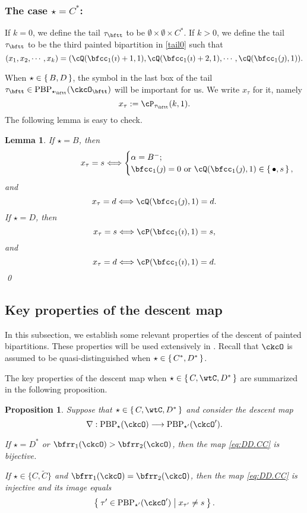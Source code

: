 \documentclass[12pt,a4paper]{amsart}
\numberwithin{equation}{section}
\newtheorem{lem}[thm]{Lemma}
\newtheorem{prop}[thm]{Proposition}
\theoremstyle{remark}
\def\ckcOp{\ckcO^{\prime}}
\def\PBP{\mathrm{PBP}}
\begin{document}
\subsubsection{The case $\star = C^*$:}
If $k=0$, we define the tail $\tau_{\bftt}$ to be
$\emptyset\times \emptyset \times C^{*}$.
If $k> 0$, we define the tail $\tau_\bftt$ to be the third painted bipartition in \eqref{tail0} such that
\[
  (x_1, x_2, \cdots, x_k)= (\cQ(\bfcc_{1}(\imath)+1,1),\cQ(\bfcc_{1}(\imath)+2,1),\cdots, \cQ(\bfcc_{1}(\jmath),1)).
\]


 When $\star \in \set{B,D}$, the symbol in the last box of the tail $\tau_\bftt\in \PBP_{\star_\bftt}(\ckcO_\bftt)$ will be important for us. We write $x_\tau$ for it, namely
\[
x_\tau := \cP_{\tau_\bftt}(k,1).
\]
 The following lemma is easy to check.

\begin{lem}\label{tailtip}
If $\star=B$, then
\[
\hspace{9em} x_\tau=s\Longleftrightarrow
\begin{cases}
  \alpha=B^-;\\
  \bfcc_1(\jmath)=0 \text{ or }\cQ(\bfcc_{1}(\jmath),1) \in\set{\bullet, s},
  \end{cases}
\]
and
\[
x_\tau=d \Longleftrightarrow
\cQ(\bfcc_{1}(\jmath),1) =d.
\]
If $\star=D$, then
\[
x_\tau=s\Longleftrightarrow \cP(\bfcc_{1}(\imath),1) = s,
\]
and
\[
x_\tau=d\Longleftrightarrow \cP(\bfcc_{1}(\imath),1) =d.
\]
\qed
\end{lem}


\subsection{Key properties of the descent map}
\label{sec:DDP}
In this subsection, we establish some relevant properties
of the descent of painted bipartitions.
These properties will be used extensively in .
Recall that $\ckcO$ is assumed to be
quasi-distinguished when $\star\in \set{C^*,D^*}$.

\medskip

The key properties of the descent map when $\star\in \set{C,\wtC,D^*}$ are
summarized in the following proposition.

\begin{prop}\label{prop:CC.bij}
Suppose that $\star \in \set{C,\wtC,D^*}$ and
consider the descent map
\begin{equation}\label{eq:DD.CC}
\nabla: \PBP_\star(\ckcO)\longrightarrow  \PBP_{\star'}(\ckcOp).
\end{equation}
\begin{enuma}
\item If
$\star=D^*$ or $\bfrr_1(\ckcO)>\bfrr_2(\ckcO)$, then
the map \eqref{eq:DD.CC}  is bijective.

\item If  $\star\in \{C,\widetilde C\}$ and $\bfrr_1(\ckcO)=\bfrr_2(\ckcO)$,
then the  map \eqref{eq:DD.CC} is injective and its image equals
\[
\Set{\tau'\in \PBP_{\star'}(\ckcOp)| x_{\tau'}\neq s}.
\]
\end{enuma}
\end{prop}
\end{document}
